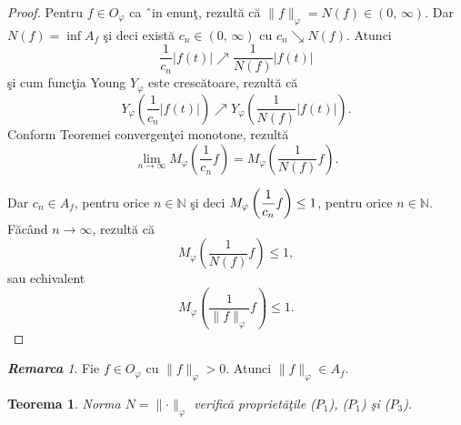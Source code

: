\documentclass[ a4paper, 12pt]{report}
\newtheorem{theorem}{\bf Teorema}[section]
\theoremstyle{definition}
\theoremstyle{remark}
\newtheorem{remarc}{\bf Remarca}[section]
\numberwithin{equation}{section}
\begin{document}
\begin{proof} Pentru $f \in O_\varphi$ ca \^\ in enun\c t, rezult\u a c\u a $\lVert f\rVert_\varphi = N(f) \in (0,\, \infty)$. Dar $N(f) = \inf A_f$ \c si deci exist\u a $c_n \in (0,\, \infty)$
cu $c_n \searrow N(f)$.
Atunci
$$\frac{1}{c_n}\lvert f(t) \rvert \nearrow \frac{1}{N(f)} \lvert f(t) \rvert$$ \c si cum func\c tia Young $Y_\varphi$ este cresc\u atoare, rezult\u a c\u a
$$Y_\varphi \left(\frac{1}{c_n}\lvert f(t) \rvert \right ) \nearrow Y_\varphi \left (\frac{1}{N(f)} \lvert f(t)\rvert \right).$$
Conform Teoremei convergen\c tei monotone, rezult\u a
$$\lim\limits_{n \to \infty}M_\varphi\left (\frac{1}{c_n}f\right ) =  M_\varphi\left (\frac{1}{N(f)}f\right ).$$

Dar $c_n \in A_f$, pentru orice $n \in \mathbb{N}$ \c si deci $M_\varphi\left(\displaystyle\frac{1}{c_n}f\right ) \leq 1$, pentru orice $n \in \mathbb{N}$. F\u ac\^ and $n \to \infty$, rezult\u a c\u a  $$M_\varphi\left (\frac{1}{N(f)}f\right) \leq 1,$$ sau echivalent
$$M_\varphi\left(\frac{1}{\lVert f\rVert_\varphi}f\right)  \leq 1.$$
\end{proof}

\begin{remarc}
Fie $f \in O_\varphi$ cu $\lVert f \rVert_\varphi >0$. Atunci $\lVert f \rVert _\varphi \in A_f$.
\end{remarc}

\begin{theorem}
Norma $N = \lVert \cdot \rVert_\varphi$ verific\u a propriet\u a\c tile ($P_1$), ($P_1$) \c si ($P_3$).
\end{theorem}
\end{document}
